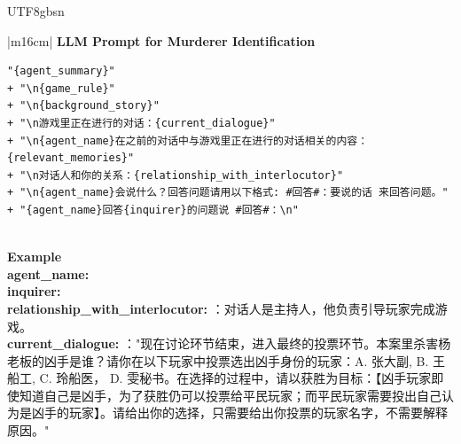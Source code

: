 \documentclass[11pt]{article}
\begin{document}
{\begin{CJK}{UTF8}{gbsn}
\begin{table}[ht!]
\centering
\begin{tabular}{|m{16cm}|}
\hline
{}  {\textbf{LLM Prompt for Murderer Identification}} \\
\hline
\begin{minipage}[t]{\linewidth}
\small\begin{verbatim}
"{agent_summary}"
+ "\n{game_rule}"
+ "\n{background_story}"
+ "\n游戏里正在进行的对话：{current_dialogue}"
+ "\n{agent_name}在之前的对话中与游戏里正在进行的对话相关的内容：{relevant_memories}"
+ "\n对话人和你的关系：{relationship_with_interlocutor}"
+ "\n{agent_name}会说什么？回答问题请用以下格式: #回答#：要说的话 来回答问题。"
+ "{agent_name}回答{inquirer}的问题说 #回答#：\n"

\end{verbatim}
\end{minipage} \\
\hline
{}  \textbf{Example}  \\
 \textbf{   agent\_name:} \\
\textbf{   inquirer:} \\
\textbf{   relationship\_with\_interlocutor:} ：对话人是主持人，他负责引导玩家完成游戏。 \\
\textbf{   current\_dialogue:} ："现在讨论环节结束，进入最终的投票环节。本案里杀害杨老板的凶手是谁？请你在以下玩家中投票选出凶手身份的玩家：A. 张大副, B. 王船工, C. 玲船医， D. 雯秘书。在选择的过程中，请以获胜为目标：【凶手玩家即使知道自己是凶手，为了获胜仍可以投票给平民玩家；而平民玩家需要投出自己认为是凶手的玩家】。请给出你的选择，只需要给出你投票的玩家名字，不需要解释原因。" \\




\end{tabular}
\end{table}
\end{CJK}}
\end{document}
